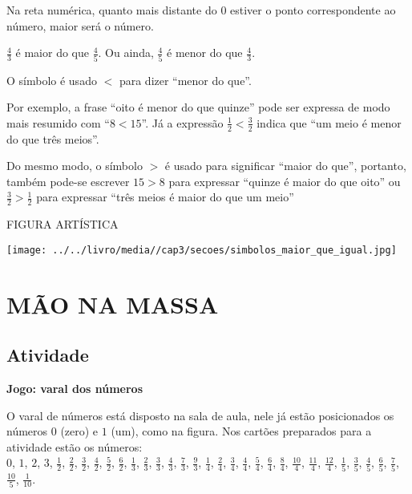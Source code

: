 \documentclass[a4,12pt]{book}
\begin{document}
Na reta numérica, quanto mais distante do 0 estiver o ponto correspondente ao número, maior será o número. 
\begin{center}
\end{center}

$\frac{4}{3}$ é maior do que $\frac{4}{5}$. Ou ainda, $\frac{4}{5}$ é menor do que $\frac{4}{3}$.


O símbolo é usado $<$ para dizer ``menor do que''.

Por exemplo, a frase ``oito é menor do que quinze'' pode ser expressa de modo mais resumido com ``$8<15$''. Já a expressão $\frac{1}{2}<\frac{3}{2}$ indica que ``um meio é menor do que três meios''.

Do mesmo modo, o símbolo $>$ é usado para significar ``maior do que'', portanto, também pode-se escrever $15>8$ para expressar ``quinze é maior do que oito'' ou $\frac{3}{2}>\frac{1}{2}$  para expressar ``três meios é maior do que um meio''

\begin{imagem*}[breakable]{}{}   FIGURA ARTÍSTICA  
  
    \texttt{[image: ../../livro/media//cap3/secoes/simbolos\_maior\_que\_igual.jpg]}   \end{imagem*}

\section{MÃO NA MASSA }

\subsection{Atividade}

{\bf Jogo: varal dos números}

O varal de números está disposto na sala de aula, nele já estão posicionados os números $0$ (zero) e $1$ (um), como na figura. Nos cartões preparados para a atividade estão os números: \\
$0$, $1$, $2$, $3$, $\frac{1}{2}$, $\frac{2}{2}$, $\frac{3}{2}$, $\frac{4}{2}$, $\frac{5}{2}$, $\frac{6}{2}$,
$\frac{1}{3}$, $\frac{2}{3}$, $\frac{3}{3}$, $\frac{4}{3}$, $\frac{7}{3}$, $\frac{9}{3}$,
$\frac{1}{4}$, $\frac{2}{4}$, $\frac{3}{4}$, $\frac{4}{4}$, $\frac{5}{4}$, $\frac{6}{4}$, $\frac{8}{4}$, $\frac{10}{4}$, $\frac{11}{4}$, $\frac{12}{4}$,
$\frac{1}{5}$, $\frac{3}{5}$, $\frac{4}{5}$, $\frac{6}{5}$, $\frac{7}{5}$, $\frac{10}{5}$,
$\frac{1}{10}$.
\end{document}
